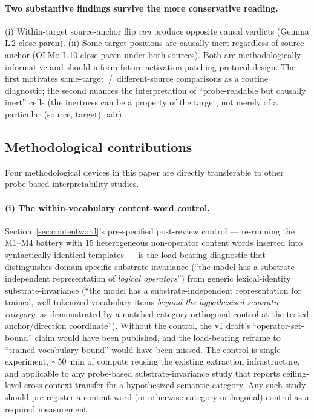 \documentclass[11pt,letterpaper]{article}
\begin{document}
\paragraph{Two substantive findings survive the more conservative
reading.} (i) Within-target source-anchor flip \emph{can} produce
opposite causal verdicts (Gemma L\,2 close-paren). (ii) Some target
positions are causally inert regardless of source anchor (OLMo
L\,10 close-paren under both sources). Both are methodologically
informative and should inform future activation-patching protocol
design. The first motivates same-target~/~different-source
comparisons as a routine diagnostic; the second nuances the
interpretation of ``probe-readable but causally inert'' cells (the
inertness can be a property of the target, not merely of a
particular (source, target) pair).

\subsection{Methodological contributions}
\label{sec:methods_contrib}

Four methodological devices in this paper are directly transferable
to other probe-based interpretability studies.

\paragraph{(i) The within-vocabulary content-word control.}
Section~\ref{sec:contentword}'s pre-specified post-review control
--- re-running the M1--M4 battery with 15 heterogeneous non-operator
content words inserted into syntactically-identical templates --- is
the load-bearing diagnostic that distinguishes domain-specific
substrate-invariance (``the model has a substrate-independent
representation of \emph{logical operators}'') from generic
lexical-identity substrate-invariance (``the model has a
substrate-independent representation for trained, well-tokenized
vocabulary items \emph{beyond the hypothesised semantic category},
as demonstrated by a matched category-orthogonal control at the
tested anchor/direction coordinate'').
Without the control, the v1 draft's ``operator-set-bound'' claim
would have been published, and the load-bearing reframe to
``trained-vocabulary-bound'' would have been missed. The control is
single-experiment, ${\sim}50$~min of compute reusing the existing
extraction infrastructure, and applicable to any probe-based
substrate-invariance study that reports ceiling-level cross-context
transfer for a hypothesized semantic category. Any such study should
pre-register a content-word (or otherwise category-orthogonal)
control as a required measurement.
\end{document}
